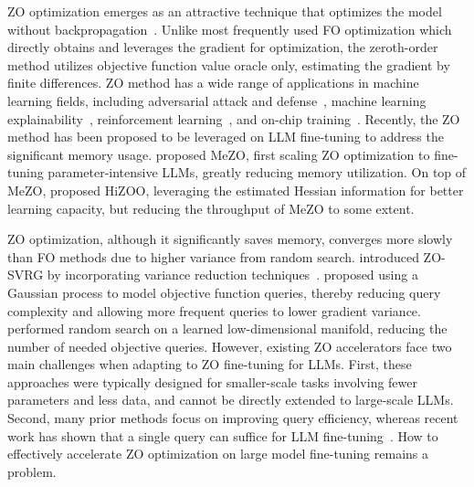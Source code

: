 ZO optimization emerges as an attractive technique that optimizes the model without backpropagation~\cite{ chen2023deepzero, chen2017zoo, ye2018hessian, verma2023certified, dhurandhar2018explanations, dhurandhar2019model}. Unlike most frequently used FO optimization which directly obtains and leverages the gradient for optimization, the zeroth-order method utilizes objective function value oracle only, estimating the gradient by finite differences.
ZO method has a wide range of applications in machine learning fields, including adversarial attack and defense~\cite{ chen2017zoo, ye2018hessian, verma2023certified}, machine learning explainability~\cite{dhurandhar2018explanations, dhurandhar2019model}, reinforcement learning~\cite{vemula2019contrasting}, and on-chip training~\cite{gu2021efficient}. 
Recently, the ZO method has been proposed to be leveraged on LLM fine-tuning to address the significant memory usage. \citet{malladi2023fine} proposed MeZO, first scaling ZO optimization to fine-tuning parameter-intensive LLMs, greatly reducing memory utilization. On top of MeZO, \citet{zhao2024second} proposed HiZOO, leveraging the estimated Hessian information for better learning capacity, but reducing the throughput of MeZO to some extent.


ZO optimization, although it significantly saves memory, converges more slowly than FO methods due to higher variance from random search. 
\citet{liu2018zeroth} introduced ZO-SVRG by incorporating variance reduction techniques~\cite{johnson2013accelerating}. \citet{shu2023zeroth} proposed using a Gaussian process to model objective function queries, thereby reducing query complexity and allowing more frequent queries to lower gradient variance. \citet{sener2020learning} performed random search on a learned low-dimensional manifold, reducing the number of needed objective queries. 
However, existing ZO accelerators face two main challenges when adapting to ZO fine-tuning for LLMs. First, these approaches were typically designed for smaller-scale tasks involving fewer parameters and less data, and cannot be directly extended to large-scale LLMs. Second, many prior methods focus on improving query efficiency, whereas recent work has shown that a single query can suffice for LLM fine-tuning~\cite{malladi2023fine}. How to effectively accelerate ZO optimization on large model fine-tuning remains a problem.



